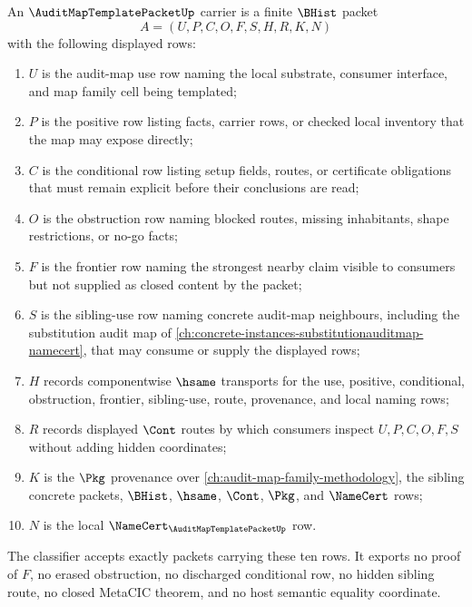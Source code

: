 \begin{definition}
\label{def:audit-map-template-packet-carrier}
An $\AuditMapTemplatePacketUp$ carrier is a finite $\BHist$ packet
$$
A=(U,P,C,O,F,S,H,R,K,N)
$$
with the following displayed rows:
\begin{enumerate}
\item $U$ is the audit-map use row naming the local substrate, consumer interface, and map family cell being templated;
\item $P$ is the positive row listing facts, carrier rows, or checked local inventory that the map may expose directly;
\item $C$ is the conditional row listing setup fields, routes, or certificate obligations that must remain explicit before their conclusions are read;
\item $O$ is the obstruction row naming blocked routes, missing inhabitants, shape restrictions, or no-go facts;
\item $F$ is the frontier row naming the strongest nearby claim visible to consumers but not supplied as closed content by the packet;
\item $S$ is the sibling-use row naming concrete audit-map neighbours, including the substitution audit map of \autoref{ch:concrete-instances-substitutionauditmap-namecert}, that may consume or supply the displayed rows;
\item $H$ records componentwise $\hsame$ transports for the use, positive, conditional, obstruction, frontier, sibling-use, route, provenance, and local naming rows;
\item $R$ records displayed $\Cont$ routes by which consumers inspect $U,P,C,O,F,S$ without adding hidden coordinates;
\item $K$ is the $\Pkg$ provenance over \autoref{ch:audit-map-family-methodology}, the sibling concrete packets, $\BHist$, $\hsame$, $\Cont$, $\Pkg$, and $\NameCert$ rows;
\item $N$ is the local $\NameCert_{\AuditMapTemplatePacketUp}$ row.
\end{enumerate}
The classifier accepts exactly packets carrying these ten rows. It exports no proof of $F$, no erased obstruction, no discharged conditional row, no hidden sibling route, no closed MetaCIC theorem, and no host semantic equality coordinate.
\end{definition}

